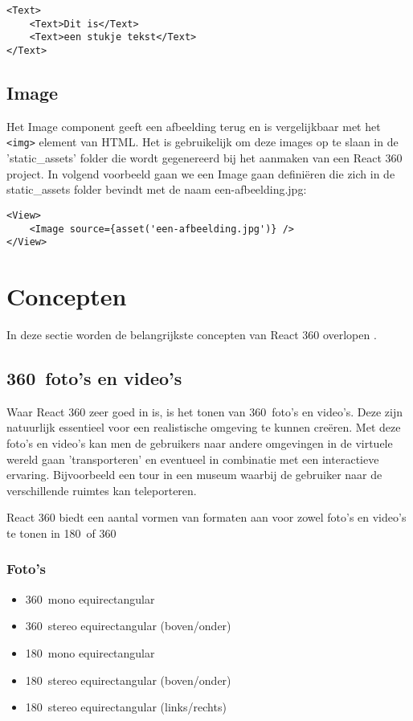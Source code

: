\begin{lstlisting}[frame=single, caption=Het Text component met kinderen.]
<Text>
	<Text>Dit is</Text>
	<Text>een stukje tekst</Text>
</Text>
\end{lstlisting}

\subsection{Image}
\label{subsec:image}
Het Image component geeft een afbeelding terug en is vergelijkbaar met het \lstinline[basicstyle=\ttfamily\color{red}]|<img>| element van HTML. Het is gebruikelijk om deze images op te slaan in de 'static\_assets' folder die wordt gegenereerd bij het aanmaken van een React 360 project. In volgend voorbeeld gaan we een Image gaan definiëren die zich in de static\_assets folder bevindt met de naam een-afbeelding.jpg:

\begin{lstlisting}[frame=single, caption=Het Image component met als bron een-afbeelding.jpg.]
<View>
	<Image source={asset('een-afbeelding.jpg')} />
</View>
\end{lstlisting}

\section{Concepten}
In deze sectie worden de belangrijkste concepten van React 360 overlopen \autocite{Mangialardi2017} \autocite{Facebook2017}.

\subsection{360\textdegree\ foto's en video's}
\label{subsec:360-photo-video}
Waar React 360 zeer goed in is, is het tonen van 360\textdegree\ foto's en video’s. Deze zijn natuurlijk essentieel voor een realistische omgeving te kunnen creëren. Met deze foto's en video's kan men de gebruikers naar andere omgevingen in de virtuele wereld gaan 'transporteren' en eventueel in combinatie met een interactieve ervaring. Bijvoorbeeld een tour in een museum waarbij de gebruiker naar de verschillende ruimtes kan teleporteren.

React 360 biedt een aantal vormen van formaten aan voor zowel foto's en video’s te tonen in 180\textdegree\ of 360\textdegree\:

\subsubsection{Foto's}
\begin{itemize}
	\item 360\textdegree\ mono equirectangular
	\item 360\textdegree\ stereo equirectangular (boven/onder)
	\item 180\textdegree\ mono equirectangular
	\item 180\textdegree\ stereo equirectangular (boven/onder)
	\item 180\textdegree\ stereo equirectangular (links/rechts)
\end{itemize}

